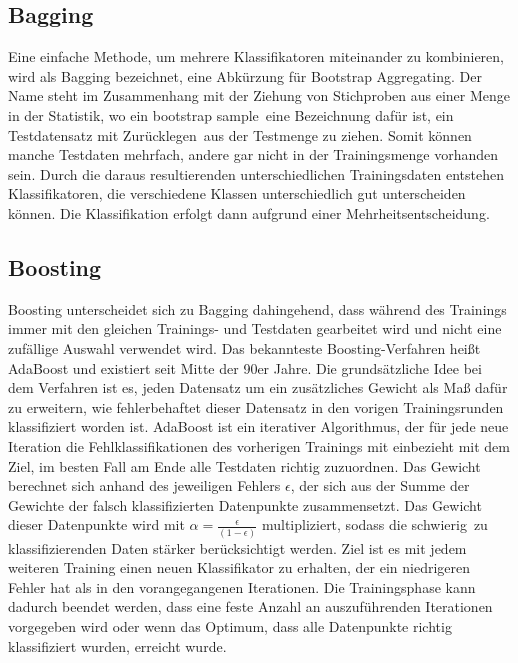 \subsection*{Bagging}
Eine einfache Methode, um mehrere Klassifikatoren miteinander zu kombinieren, wird als Bagging bezeichnet, eine Abkürzung für Bootstrap Aggregating. Der Name steht im Zusammenhang mit der Ziehung von Stichproben aus einer Menge in der Statistik, wo ein \glqq bootstrap sample\grqq\ eine Bezeichnung dafür ist, ein Testdatensatz \glqq mit Zurücklegen\grqq\ aus der Testmenge zu ziehen. Somit können manche Testdaten mehrfach, andere gar nicht in der Trainingsmenge vorhanden sein. Durch die daraus resultierenden unterschiedlichen Trainingsdaten entstehen Klassifikatoren, die verschiedene Klassen unterschiedlich gut unterscheiden können. Die Klassifikation erfolgt dann aufgrund einer Mehrheitsentscheidung.

\subsection*{Boosting}
Boosting unterscheidet sich zu Bagging dahingehend, dass während des Trainings immer mit den gleichen Trainings- und Testdaten gearbeitet wird und nicht eine zufällige Auswahl verwendet wird.
Das bekannteste Boosting-Verfahren heißt AdaBoost und existiert seit Mitte der 90er Jahre. Die grundsätzliche Idee bei dem Verfahren ist es, jeden Datensatz um ein zusätzliches Gewicht als Maß dafür zu erweitern, wie fehlerbehaftet dieser Datensatz in den vorigen Trainingsrunden klassifiziert worden ist. AdaBoost ist ein iterativer Algorithmus, der für jede neue Iteration die Fehlklassifikationen des vorherigen Trainings mit einbezieht mit dem Ziel, im besten Fall am Ende alle Testdaten richtig zuzuordnen. Das Gewicht berechnet sich anhand des jeweiligen Fehlers $\epsilon$, der sich aus der Summe der Gewichte der falsch klassifizierten Datenpunkte zusammensetzt. Das Gewicht dieser Datenpunkte wird mit
$ \alpha = \frac{\epsilon}{(1-\epsilon)} $ 
multipliziert, sodass die \glqq schwierig\grqq\ zu klassifizierenden Daten stärker berücksichtigt werden. Ziel ist es mit jedem weiteren Training einen neuen Klassifikator zu erhalten, der ein niedrigeren Fehler hat als in den vorangegangenen Iterationen. Die Trainingsphase kann dadurch beendet werden, dass eine feste Anzahl an auszuführenden Iterationen vorgegeben wird oder wenn das Optimum, dass alle Datenpunkte richtig klassifiziert wurden, erreicht wurde.

